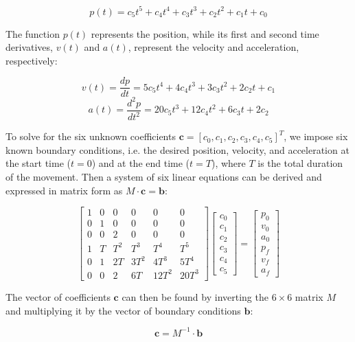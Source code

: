 $$ p(t) = c_5t^5 + c_4t^4 + c_3t^3 + c_2t^2 + c_1t + c_0 $$

The function $p(t)$ represents the position, while its first and second time derivatives, $v(t)$ and $a(t)$,
represent the velocity and acceleration, respectively:

$$ v(t) = \frac{dp}{dt} = 5c_5t^4 + 4c_4t^3 + 3c_3t^2 + 2c_2t + c_1 $$
$$ a(t) = \frac{d^2p}{dt^2} = 20c_5t^3 + 12c_4t^2 + 6c_3t + 2c_2 $$

To solve for the six unknown coefficients $\mathbf{c} = [c_0, c_1, c_2, c_3, c_4, c_5]^T$, we impose six
known boundary conditions, i.e. the desired position, velocity, and acceleration at the start time ($t = 0$)
and at the end time ($t = T$), where $T$ is the total duration of the movement. Then a system of six linear
equations can be derived and expressed in matrix form as $M \cdot \mathbf{c} = \mathbf{b}$:

$$
  \begin{bmatrix}
    1 & 0 & 0 & 0 & 0 & 0 \\
    0 & 1 & 0 & 0 & 0 & 0 \\
    0 & 0 & 2 & 0 & 0 & 0 \\
    1 & T & T^2 & T^3 & T^4 & T^5 \\
    0 & 1 & 2T & 3T^2 & 4T^3 & 5T^4 \\
    0 & 0 & 2 & 6T & 12T^2 & 20T^3
  \end{bmatrix}
  \begin{bmatrix}
    c_0 \\ c_1 \\ c_2 \\ c_3 \\ c_4 \\ c_5
  \end{bmatrix}
  =
  \begin{bmatrix}
    p_0 \\
    v_0 \\
    a_0 \\
    p_f \\
    v_f \\
    a_f
  \end{bmatrix}
$$

The vector of coefficients $\mathbf{c}$ can then be found by inverting the $6 \times 6$ matrix $M$ and
multiplying it by the vector of boundary conditions $\mathbf{b}$:

\begin{equation}
  \mathbf{c} = M^{-1} \cdot \mathbf{b}
  \label{eqn:quintic_poly_solution}
\end{equation}

